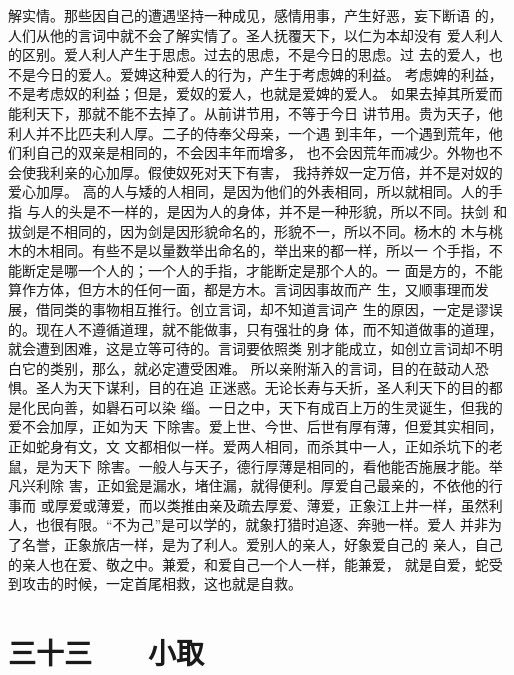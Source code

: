 \documentclass[12pt,UTF8]{ctexbook}
\begin{document}
解实情。那些因自己的遭遇坚持一种成见，感情用事，产生好恶，妄下断语 
的，人们从他的言词中就不会了解实情了。圣人抚覆天下，以仁为本却没有 
爱人利人的区别。爱人利人产生于思虑。过去的思虑，不是今日的思虑。过 
去的爱人，也不是今日的爱人。爱婢这种爱人的行为，产生于考虑婢的利益。 
考虑婢的利益，不是考虑奴的利益；但是，爱奴的爱人，也就是爱婢的爱人。 
如果去掉其所爱而能利天下，那就不能不去掉了。从前讲节用，不等于今日 
讲节用。贵为天子，他利人并不比匹夫利人厚。二子的侍奉父母亲，一个遇 
到丰年，一个遇到荒年，他们利自己的双亲是相同的，不会因丰年而增多， 
也不会因荒年而减少。外物也不会使我利亲的心加厚。假使奴死对天下有害， 
我持养奴一定万倍，并不是对奴的爱心加厚。 
高的人与矮的人相同，是因为他们的外表相同，所以就相同。人的手指 
与人的头是不一样的，是因为人的身体，并不是一种形貌，所以不同。扶剑 
和拔剑是不相同的，因为剑是因形貌命名的，形貌不一，所以不同。杨木的 
木与桃木的木相同。有些不是以量数举出命名的，举出来的都一样，所以一 
个手指，不能断定是哪一个人的；一个人的手指，才能断定是那个人的。一 
面是方的，不能算作方体，但方木的任何一面，都是方木。言词因事故而产 
生，又顺事理而发展，借同类的事物相互推行。创立言词，却不知道言词产 
生的原因，一定是谬误的。现在人不遵循道理，就不能做事，只有强壮的身 
体，而不知道做事的道理，就会遭到困难，这是立等可待的。言词要依照类 
别才能成立，如创立言词却不明白它的类别，那么，就必定遭受困难。 
所以亲附渐入的言词，目的在鼓动人恐惧。圣人为天下谋利，目的在追 
正迷惑。无论长寿与夭折，圣人利天下的目的都是化民向善，如礜石可以染 
缁。一日之中，天下有成百上万的生灵诞生，但我的爱不会加厚，正如为天 
下除害。爱上世、今世、后世有厚有薄，但爱其实相同，正如蛇身有文，文 
文都相似一样。爱两人相同，而杀其中一人，正如杀坑下的老鼠，是为天下 
除害。一般人与天子，德行厚薄是相同的，看他能否施展才能。举凡兴利除 
害，正如瓮是漏水，堵住漏，就得便利。厚爱自己最亲的，不依他的行事而 
或厚爱或薄爱，而以类推由亲及疏去厚爱、薄爱，正象江上井一样，虽然利 
人，也很有限。“不为己”是可以学的，就象打猎时追逐、奔驰一样。爱人 
并非为了名誉，正象旅店一样，是为了利人。爱别人的亲人，好象爱自己的 
亲人，自己的亲人也在爱、敬之中。兼爱，和爱自己一个人一样，能兼爱， 
就是自爱，蛇受到攻击的时候，一定首尾相救，这也就是自救。 

\chapter{三十三　　小取}
\end{document}
